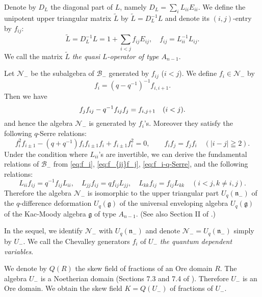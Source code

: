 \documentclass[12pt,twoside]{article}
\newcommand\B{{\mathcal B}}
\newcommand\N{{\mathcal N}}
\newcommand\g{{\mathfrak g}}
\newcommand\n{{\mathfrak n}}
\newcommand\tL{{\widetilde L}}
\theoremstyle{plain} %
\theoremstyle{definition} %
\theoremstyle{definition} %
\numberwithin{theorem}{section}
\numberwithin{equation}{section}
\numberwithin{figure}{section}
\numberwithin{table}{section}
\begin{document}
Denote by $D_L$ the diagonal part of $L$, namely $D_L=\sum_i L_{ii}E_{ii}$.
We define the unipotent upper triangular matrix $\tL$ by $\tL=D_L^{-1}L$
and denote its $(i,j)$-entry by $f_{ij}$:
\begin{equation*}
 \tL = D_L^{-1}L = 1 + \sum_{i<j} f_{ij}E_{ij}, \quad 
 f_{ij} = L_{ii}^{-1}L_{ij}.
\end{equation*}
We call the matrix $\tL$ {\em the quasi $L$-operator of type $A_{n-1}$}.

Let $\N_-$ be the subalgebra of $\B_-$ generated by $f_{ij}$ ($i<j$).
We define $f_i\in\N_-$ by
\begin{equation}
 f_i = (q-q^{-1})^{-1} f_{i,i+1}.
 \label{eq:f_i}
\end{equation}
Then we have
\begin{equation}
 f_j f_{ij} - q^{-1} f_{ij} f_j = f_{i,j+1} \quad (i<j).
 \label{eq:f_{ij}f_j}
\end{equation}
and hence the algebra $\N_-$ is generated by $f_i$'s.
Moreover they satisfy the following $q$-Serre relations:
\begin{equation}
 f_i^2 f_{i\pm1} - (q+q^{-1}) f_if_{i\pm1}f_i + f_{i\pm1}f_i^2=0, \qquad
 f_if_j=f_jf_i \quad (|i-j|\geqq 2).
 \label{eq:f_i-q-Serre}
\end{equation}
Under the condition where $L_{ii}$'s are invertible, 
we can derive the fundamental relations of $\B_-$ from
\eqref{eq:f_i}, \eqref{eq:f_{ij}f_j}, \eqref{eq:f_i-q-Serre},  
and the following relations:
\begin{equation*}
 L_{ii}f_{ij}=q^{-1}f_{ij}L_{ii}, \quad
 L_{jj}f_{ij}=q     f_{ij}L_{jj}, \quad
 L_{kk}f_{ij}=f_{ij}L_{kk} \quad
 (i<j, k\ne i,j).
\end{equation*}
Therefore the algebra $\N_-$ is isomorphic to  
the upper triangular part $U_q(\n_-)$ 
of the $q$-difference deformation $U_q(\g)$ of
the universal enveloping algebra $U_q(\g)$ 
of the Kac-Moody algebra $\g$ of type $A_{n-1}$.
(See also Section II of \cite{DF}.)

In the sequel, we identify $\N_-$ with $U_q(\n_-)$
and denote $\N_-=U_q(\n_-)$ simply by $U_-$. 
We call the Chevalley generators $f_i$ of $U_-$ 
{\em the quantum dependent variables}.

We denote by $Q(R)$ the skew field of fractions of an Ore domain $R$.
The algebra $U_-$ is a Noetherian domain 
(Sections 7.3 and 7.4 of \cite{Jos-1995}).
Therefore $U_-$ is an Ore domain.
We obtain the skew field $K=Q(U_-)$ of fractions of $U_-$. 

\end{document}
